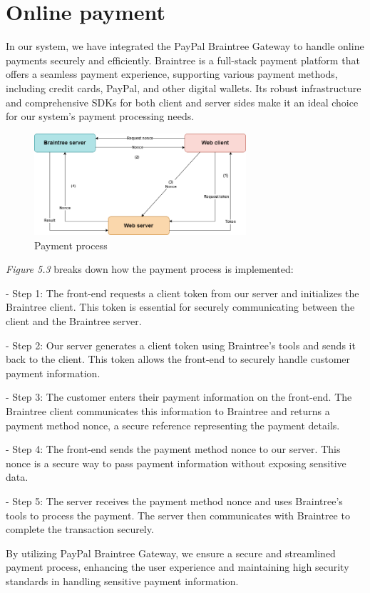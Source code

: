 \section{Online payment}

In our system, we have integrated the PayPal Braintree Gateway to handle online payments securely and efficiently. Braintree is a full-stack payment platform that offers a seamless payment experience, supporting various payment methods, including credit cards, PayPal, and other digital wallets. Its robust infrastructure and comprehensive SDKs for both client and server sides make it an ideal choice for our system's payment processing needs.

\begin{figure}[H]
    \centering
    \includegraphics[width=0.7\textwidth]{Figures/payment-strat.png}
    \caption{Payment process}
\end{figure}

\emph{Figure 5.3} breaks down how the payment process is implemented:

- Step 1:
The front-end requests a client token from our server and initializes the Braintree client. This token is essential for securely communicating between the client and the Braintree server.

- Step 2:
Our server generates a client token using Braintree's tools and sends it back to the client. This token allows the front-end to securely handle customer payment information.

- Step 3:
The customer enters their payment information on the front-end. The Braintree client communicates this information to Braintree and returns a payment method nonce, a secure reference representing the payment details.

- Step 4:
The front-end sends the payment method nonce to our server. This nonce is a secure way to pass payment information without exposing sensitive data.

- Step 5:
The server receives the payment method nonce and uses Braintree's tools to process the payment. The server then communicates with Braintree to complete the transaction securely.

By utilizing PayPal Braintree Gateway, we ensure a secure and streamlined payment process, enhancing the user experience and maintaining high security standards in handling sensitive payment information.

